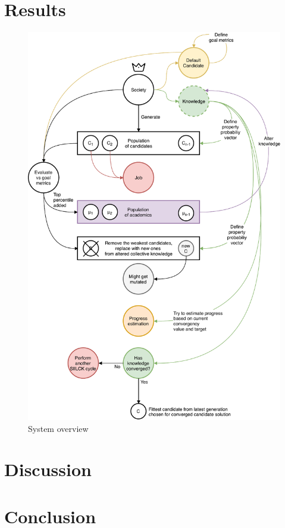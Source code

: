 \documentclass[a4paper,english]{report}
\begin{document}
	\chapter{Results}
		\begin{figure}[h]
		\includegraphics[width=\textwidth]{overview}
		\caption{System overview}
		\end{figure}
	
	
	\chapter{Discussion}
	
	
	\chapter{Conclusion}
	
\end{document}
